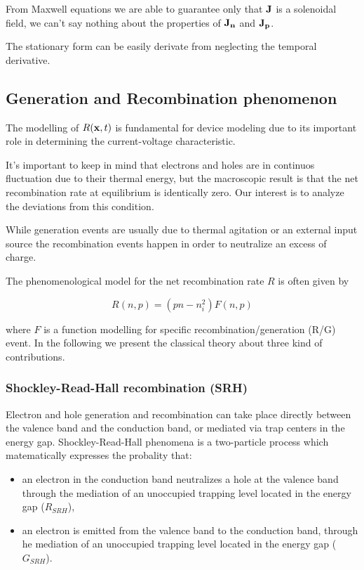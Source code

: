 From Maxwell equations we are able to guarantee only that $\mathbf{J}$ is a solenoidal field, we can't say nothing about the properties of $\mathbf{J_n}$ and $\mathbf{J_p}$. 

The stationary form can be easily derivate from  neglecting the temporal derivative.





\subsection{Generation and Recombination phenomenon}
\label{subsection: RG}

The modelling of $R(\mathbf{x},t)$ is fundamental for device modeling due to its important role in determining the current-voltage characteristic.
 
It's important to keep in mind that electrons and holes are in continuos fluctuation due to their thermal energy, but the macroscopic result is that the net recombination rate at equilibrium  is identically zero. Our interest is to analyze the deviations from this condition. 

While generation events are usually due to thermal agitation or an external input source the recombination events happen in order to neutralize an excess of charge.

The phenomenological model for the net recombination rate $R$ is often given by 

\begin{equation}
\label{eq: generic RG}
R(n,p) = (pn-n_i^2)F(n,p)
\end{equation}

where $F$ is a function modelling for specific recombination/generation (R/G) event.
In the following we present the classical theory about three kind of contributions. 

\subsubsection{Shockley-Read-Hall recombination (SRH)}

Electron and hole generation and recombination can take place directly between the valence band and the conduction band, or mediated via trap centers in the energy gap. Shockley-Read-Hall phenomena is a two-particle process which matematically expresses the probality that:
\begin{itemize}
\item an electron in the conduction band neutralizes a hole at the valence band through the mediation of an unoccupied trapping level located in the energy gap ($R_{SRH}$),
\item an electron is emitted from the valence band to the conduction band, through he mediation of an unoccupied trapping level located in the energy gap ($G_{SRH}$).
\end{itemize}

